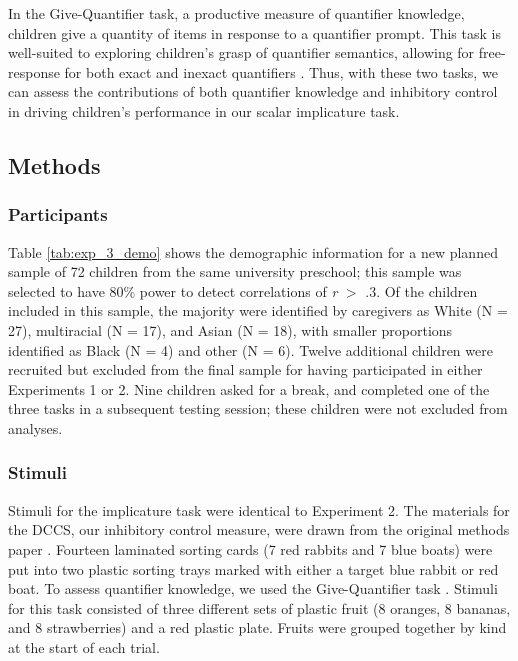 \documentclass[man]{apa2}
\begin{document}
In the Give-Quantifier task, a productive measure of quantifier knowledge, children give a quantity of items in response to a quantifier prompt. This task is well-suited to exploring children's grasp of quantifier semantics, allowing for free-response for both exact and inexact quantifiers \cite{barner2009}. Thus, with these two tasks, we can assess the contributions of both quantifier knowledge and inhibitory control in driving children's performance in our scalar implicature task.

\subsection{Methods}

\subsubsection{Participants}

Table \ref{tab:exp_3_demo} shows the demographic information for a new planned sample of 72 children from the same university preschool; this sample was selected to have 80\% power to detect correlations of \emph{r} $>$ .3. Of the children included in this sample, the majority were identified by caregivers as White (N = 27), multiracial (N = 17), and Asian (N = 18), with smaller proportions identified as Black (N = 4) and other (N = 6). Twelve additional children were recruited but excluded from the final sample for having participated in either Experiments 1 or 2. Nine children asked for a break, and completed one of the three tasks in a subsequent testing session; these children were not excluded from analyses.

\subsubsection{Stimuli} Stimuli for the implicature task were identical to Experiment 2. The materials for the DCCS, our inhibitory control measure, were drawn from the original methods paper \cite{zelazo2006}. Fourteen laminated sorting cards (7 red rabbits and 7 blue boats) were put into two plastic sorting trays marked with either a target blue rabbit or red boat. To assess quantifier knowledge, we used the Give-Quantifier task \cite{barner2009}. Stimuli for this task consisted of three different sets of plastic fruit (8 oranges, 8 bananas, and 8 strawberries) and a red plastic plate. Fruits were grouped together by kind at the start of each trial.
\end{document}
